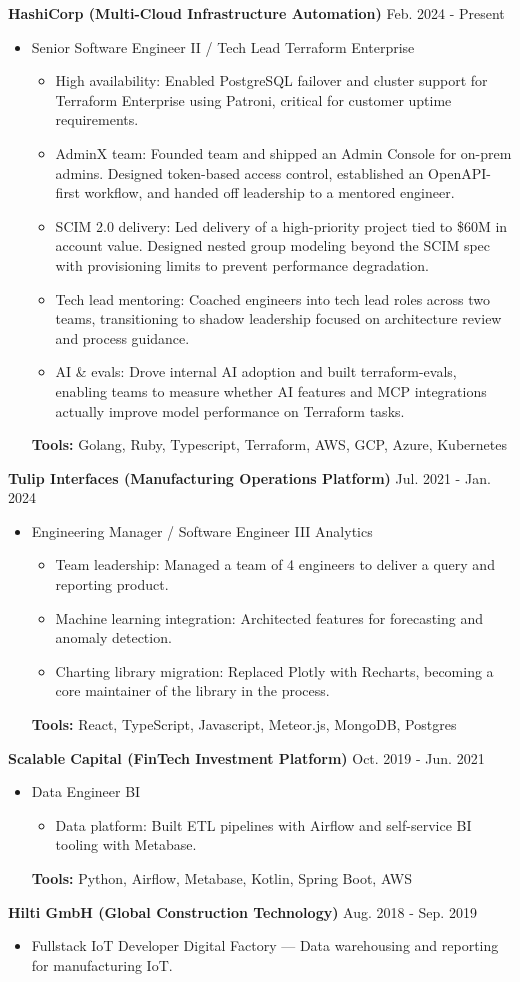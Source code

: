 \documentclass[letterpaper,11pt]{article}
\newcommand{\roleSpacing}{\vspace{4pt}}
\newcommand{\role}[2]{\item{#1 \hfill #2 \\}} %
\newcommand{\station}[2]{\textbf{#1}  \hfill #2 \\} %
\newcommand{\project}[2]{\item\small{#1: #2}} %
\newcommand{\resumeSubHeadingListStart}{\begin{itemize}[leftmargin=*]}
\newcommand{\resumeSubHeadingListEnd}{\end{itemize}}
\newcommand{\projectliststart}{\begin{itemize}[leftmargin=*] \vspace{-5pt} }
\newcommand{\projectlistend}{\end{itemize}\vspace{-5pt}}
\begin{document}
\station{HashiCorp (Multi-Cloud Infrastructure Automation)}{Feb. 2024 - Present}
\resumeSubHeadingListStart
\role{Senior Software Engineer II / Tech Lead}{Terraform Enterprise}
\projectliststart
\project{High availability}{Enabled PostgreSQL failover and cluster support for Terraform Enterprise using Patroni, critical for customer uptime requirements.}
\project{AdminX team}{Founded team and shipped an Admin Console for on-prem admins. Designed token-based access control, established an OpenAPI-first workflow, and handed off leadership to a mentored engineer.}
\project{SCIM 2.0 delivery}{Led delivery of a high-priority project tied to \$60M in account value. Designed nested group modeling beyond the SCIM spec with provisioning limits to prevent performance degradation.}
\project{Tech lead mentoring}{Coached engineers into tech lead roles across two teams, transitioning to shadow leadership focused on architecture review and process guidance.}
\project{AI \& evals}{Drove internal AI adoption and built terraform-evals, enabling teams to measure whether AI features and MCP integrations actually improve model performance on Terraform tasks.}
\projectlistend
\textbf{Tools:} Golang, Ruby, Typescript, Terraform, AWS, GCP, Azure, Kubernetes
\resumeSubHeadingListEnd
\roleSpacing
\station{Tulip Interfaces (Manufacturing Operations Platform)}{Jul. 2021 - Jan. 2024}
\resumeSubHeadingListStart
\role{Engineering Manager / Software Engineer III}{Analytics}
\projectliststart
\project{Team leadership}{Managed a team of 4 engineers to deliver a query and reporting product.}
\project{Machine learning integration}{Architected features for forecasting and anomaly detection.}
\project{Charting library migration}{Replaced Plotly with Recharts, becoming a core maintainer of the library in the process.}
\projectlistend
\textbf{Tools:} React, TypeScript, Javascript, Meteor.js, MongoDB, Postgres
\resumeSubHeadingListEnd

\roleSpacing

\station{Scalable Capital (FinTech Investment Platform)}{Oct. 2019 - Jun. 2021}
\resumeSubHeadingListStart
\role{Data Engineer}{BI}
\projectliststart
\project{Data platform}{Built ETL pipelines with Airflow and self-service BI tooling with Metabase.}
\projectlistend
\textbf{Tools:} Python, Airflow, Metabase, Kotlin, Spring Boot, AWS
\resumeSubHeadingListEnd

\roleSpacing

\station{Hilti GmbH (Global Construction Technology)}{Aug. 2018 - Sep. 2019}
\resumeSubHeadingListStart
\role{Fullstack IoT Developer}{Digital Factory --- Data warehousing and reporting for manufacturing IoT.}
\resumeSubHeadingListEnd
\end{document}
